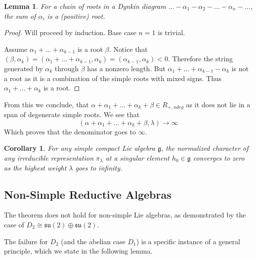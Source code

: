\documentclass[11pt, a4paper]{article}
\newcommand{\su}{\mathfrak{su}}
\newtheorem{lemma}[theorem]{Lemma}
\newtheorem{corollary}[theorem]{Corollary}
\theoremstyle{definition}
\theoremstyle{remark}
\begin{document}
\begin{lemma}
For a chain of roots in a Dynkin diagram $\dots-\alpha_{1} -\alpha_{2}-\dots-\alpha_{n}-\dots$, the sum of $\alpha_{i}$ is a (positive) root.
\end{lemma}

\begin{proof}
Will proceed by induction. Base case $n=1$ is trivial.

Assume $\alpha_{1}+\dots+\alpha_{k-1}$ is a root $\beta$. Notice that $(\beta,\alpha_{k})=(\alpha_{1}+\dots+\alpha_{k-1},\alpha_{k})=(\alpha_{k-1},\alpha_{k})<0$. Therefore the string generated by $\alpha_{k}$ through $\beta$ has a nonzero length. But $\alpha_{1}+\dots+\alpha_{k-1}-\alpha_{k}$ is not a root as it is a combination of the simple roots with mixed signs. Thus $\alpha_{1}+\dots+\alpha_{k}$ is a root.
\end{proof}

From this we conclude, that  $\alpha+\alpha_1+\dots+\alpha_k+ \beta \in R_{+,ndeg}$ as it does not lie in a span of degenerate simple roots. We see that
$$
    (\alpha+\alpha_1+\dots+\alpha_k+ \beta,\lambda)\to \infty
$$ 
Which proves that the denominator goes to $\infty$.

\begin{corollary}
    For any simple compact Lie algebra $\mathfrak{g}$, the normalized character of any irreducible representation $\pi_\lambda$ at a singular element $h_0 \in \mathfrak{g}$ converges to zero as the highest weight $\lambda$ goes to infinity.
\end{corollary}

\subsection{Non-Simple Reductive Algebras}
\label{sec:non-simple}
The theorem does not hold for non-simple Lie algebras, as demonstrated by the case of $D_2 \cong \su(2) \oplus \su(2)$. 

The failure for $D_2$ (and the abelian case $D_1$) is a specific instance of a general principle, which we state in the following lemma.
\end{document}
